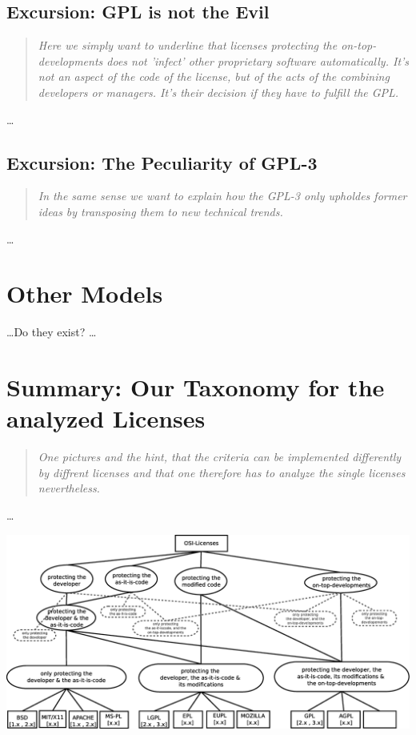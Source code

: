 \subsection{Excursion: GPL is not the Evil}
\footnotesize
\begin{quote}\itshape
Here we simply want to underline that licenses protecting the
on-top-developments does not 'infect' other proprietary software automatically.
It's not an aspect of the code of the license, but of the acts of the combining
developers or managers. It's their decision if they have to fulfill the GPL.
\end{quote}
\normalsize
\ldots

\subsection{Excursion: The Peculiarity of GPL-3}
\footnotesize
\begin{quote}\itshape
In the same sense we want to explain how the GPL-3 only upholdes former ideas by
transposing them to new technical trends.
\end{quote}
\normalsize
\ldots

\section{Other Models}
\ldots Do they exist? \ldots

\section{Summary: Our Taxonomy for the analyzed Licenses}
\footnotesize
\begin{quote}\itshape
One pictures and the hint, that the criteria can be implemented differently by
diffrent licenses and that one therefore has to analyze the single licenses
nevertheless.
\end{quote}
\normalsize
\ldots

\includegraphics[scale=0.32]{graphics/licenses-cluster.eps}


%
